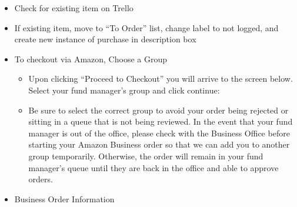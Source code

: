 \documentclass[]{book}
\providecommand{\tightlist}{%
  \setlength{\itemsep}{0pt}\setlength{\parskip}{0pt}}
\begin{document}
\begin{itemize}
\tightlist
\item
  Check for existing item on Trello
\item
  If existing item, move to ``To Order'' list, change label to not
  logged, and create new instance of purchase in description box
\item
  To checkout via Amazon, Choose a Group

  \begin{itemize}
  \tightlist
  \item
    Upon clicking ``Proceed to Checkout'' you will arrive to the screen
    below. Select your fund manager's group and click continue:
  \item
    Be sure to select the correct group to avoid your order being
    rejected or sitting in a queue that is not being reviewed. In the
    event that your fund manager is out of the office, please check with
    the Business Office before starting your Amazon Business order so
    that we can add you to another group temporarily. Otherwise, the
    order will remain in your fund manager's queue until they are back
    in the office and able to approve orders.
  \end{itemize}
\item
  Business Order Information


\end{itemize}
\end{document}
